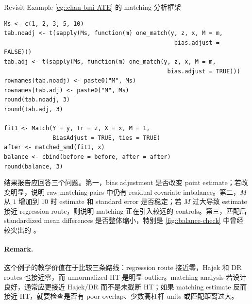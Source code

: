\begin{exercisesolution}{Revisit Example \cref{eg::chan-bmi-ATE}}{ 的 matching 分析框架}
\begin{lstlisting}
Ms <- c(1, 2, 3, 5, 10)
tab.noadj <- t(sapply(Ms, function(m) one_match(y, z, x, M = m,
                                                 bias.adjust = FALSE)))
tab.adj <- t(sapply(Ms, function(m) one_match(y, z, x, M = m,
                                               bias.adjust = TRUE)))
rownames(tab.noadj) <- paste0("M", Ms)
rownames(tab.adj) <- paste0("M", Ms)
round(tab.noadj, 3)
round(tab.adj, 3)

fit1 <- Match(Y = y, Tr = z, X = x, M = 1,
              BiasAdjust = TRUE, ties = TRUE)
after <- matched_smd(fit1, x)
balance <- cbind(before = before, after = after)
round(balance, 3)
\end{lstlisting}

结果报告应回答三个问题。第一，bias adjustment 是否改变 point estimate；若改变明显，说明 raw matching pairs 中仍有 residual covariate imbalance。第二，$M$ 从 $1$ 增加到 $10$ 时 estimate 和 standard error 是否稳定；若 $M$ 过大导致 estimate 接近 regression route，则说明 matching 正在引入较远的 controls。第三，匹配后 standardized mean differences 是否整体缩小，特别是 \cref{fig::balance-check} 中曾经较突出的 。

\paragraph{Remark.}
这个例子的教学价值在于比较三条路线：regression route 接近零，Hajek 和 DR routes 也接近零，而 unnormalized HT 是明显 outlier。matching analysis 若设计良好，通常应更接近 Hajek/DR 而不是未截断 HT；如果 matching estimate 反而接近 HT，就要检查是否有 poor overlap、少数高杠杆 units 或匹配距离过大。
\end{exercisesolution}

